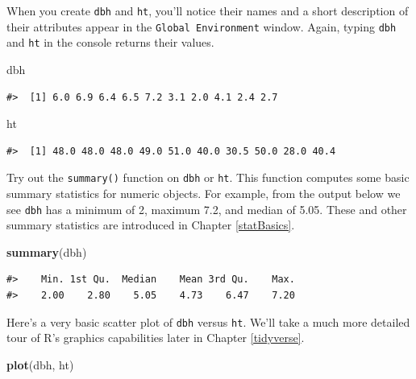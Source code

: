 \documentclass[
  11pt,
]{krantz}
\newenvironment{Shaded}{\begin{snugshade}}{\end{snugshade}}
\newcommand{\KeywordTok}[1]{\textcolor[rgb]{0.13,0.29,0.53}{\textbf{#1}}}
\newcommand{\NormalTok}[1]{#1}
\theoremstyle{definition}
\theoremstyle{definition}
\theoremstyle{definition}
\theoremstyle{definition}
\theoremstyle{remark}
\begin{document}
When you create \texttt{dbh} and \texttt{ht}, you'll notice their names and a short description of their attributes appear in the \texttt{Global\ Environment} window. Again, typing \texttt{dbh} and \texttt{ht} in the console returns their values.

\begin{Shaded}
\begin{Highlighting}[]
\NormalTok{dbh}
\end{Highlighting}
\end{Shaded}

\begin{verbatim}
#>  [1] 6.0 6.9 6.4 6.5 7.2 3.1 2.0 4.1 2.4 2.7
\end{verbatim}

\begin{Shaded}
\begin{Highlighting}[]
\NormalTok{ht}
\end{Highlighting}
\end{Shaded}

\begin{verbatim}
#>  [1] 48.0 48.0 48.0 49.0 51.0 40.0 30.5 50.0 28.0 40.4
\end{verbatim}

Try out the \texttt{summary()} function on \texttt{dbh} or \texttt{ht}. This function computes some basic summary statistics for numeric objects. For example, from the output below we see \texttt{dbh} has a minimum of 2, maximum 7.2, and median of 5.05. These and other summary statistics are introduced in Chapter \ref{statBasics}.

\begin{Shaded}
\begin{Highlighting}[]
\KeywordTok{summary}\NormalTok{(dbh)}
\end{Highlighting}
\end{Shaded}

\begin{verbatim}
#>    Min. 1st Qu.  Median    Mean 3rd Qu.    Max. 
#>    2.00    2.80    5.05    4.73    6.47    7.20
\end{verbatim}

Here's a very basic scatter plot of \texttt{dbh} versus \texttt{ht}. We'll take a much more detailed tour of R's graphics capabilities later in Chapter \ref{tidyverse}.

\begin{Shaded}
\begin{Highlighting}[]
\KeywordTok{plot}\NormalTok{(dbh, ht)}
\end{Highlighting}
\end{Shaded}
\end{document}
